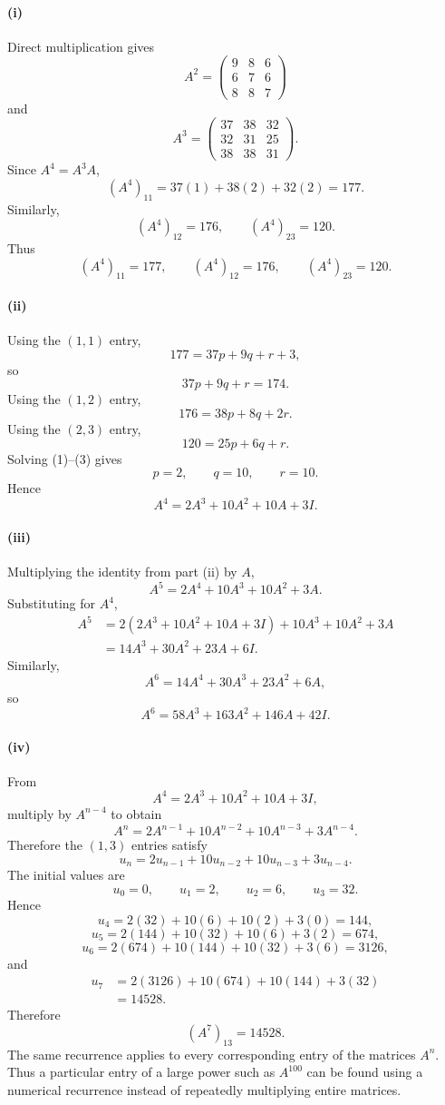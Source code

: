 \begin{solution}
\paragraph{(i)} Direct multiplication gives \[ A^2= \begin{pmatrix} 9&8&6\\ 6&7&6\\ 8&8&7 \end{pmatrix} \] and \[ A^3= \begin{pmatrix} 37&38&32\\ 32&31&25\\ 38&38&31 \end{pmatrix}. \] Since \(A^4=A^3A\), \[ (A^4)_{11} = 37(1)+38(2)+32(2) =177. \] Similarly, \[ (A^4)_{12}=176, \qquad (A^4)_{23}=120. \] Thus \[ \boxed{ (A^4)_{11}=177,\qquad (A^4)_{12}=176,\qquad (A^4)_{23}=120. } \] 
\paragraph{(ii)} Using the \((1,1)\) entry, \[ 177=37p+9q+r+3, \] so \[ 37p+9q+r=174. \tag{1} \] Using the \((1,2)\) entry, \[ 176=38p+8q+2r. \tag{2} \] Using the \((2,3)\) entry, \[ 120=25p+6q+r. \tag{3} \] Solving (1)--(3) gives \[ \boxed{p=2,\qquad q=10,\qquad r=10}. \] Hence \[ \boxed{ A^4=2A^3+10A^2+10A+3I. } \] 
\paragraph{(iii)} Multiplying the identity from part (ii) by \(A\), \[ A^5 = 2A^4+10A^3+10A^2+3A. \] Substituting for \(A^4\), \begin{align*} A^5 &= 2(2A^3+10A^2+10A+3I) +10A^3+10A^2+3A\\ &= \boxed{ 14A^3+30A^2+23A+6I }. \end{align*} Similarly, \[ A^6 = 14A^4+30A^3+23A^2+6A, \] so \[ \boxed{ A^6 = 58A^3+163A^2+146A+42I. } \] 
\paragraph{(iv)} From \[ A^4=2A^3+10A^2+10A+3I, \] multiply by \(A^{n-4}\) to obtain \[ A^n = 2A^{n-1} +10A^{n-2} +10A^{n-3} +3A^{n-4}. \] Therefore the \((1,3)\) entries satisfy \[ \boxed{ u_n = 2u_{n-1} +10u_{n-2} +10u_{n-3} +3u_{n-4}. } \] The initial values are \[ u_0=0,\qquad u_1=2,\qquad u_2=6,\qquad u_3=32. \] Hence \[ u_4 = 2(32)+10(6)+10(2)+3(0) =144, \] \[ u_5 = 2(144)+10(32)+10(6)+3(2) =674, \] \[ u_6 = 2(674)+10(144)+10(32)+3(6) =3126, \] and \begin{align*} u_7 &= 2(3126)+10(674)+10(144)+3(32)\\ &=14528. \end{align*} Therefore \[ \boxed{(A^7)_{13}=14528}. \] The same recurrence applies to every corresponding entry of the matrices \(A^n\). Thus a particular entry of a large power such as \(A^{100}\) can be found using a numerical recurrence instead of repeatedly multiplying entire matrices.
\end{solution}

